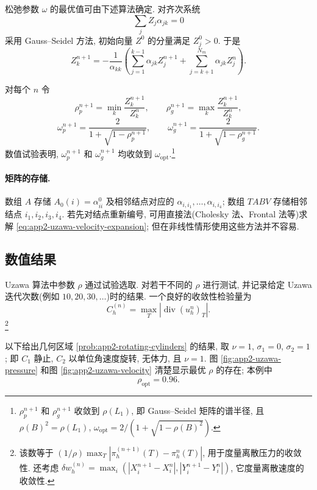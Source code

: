 松弛参数 $\omega$ 的最优值可由下述算法确定. 对齐次系统
\[
\sum_jZ_j\alpha_{jk}=0
\]
采用 Gauss--Seidel 方法, 初始向量 $Z^0$ 的分量满足 $Z_j^0>0$. 于是
\begin{equation}
Z_k^{n+1}=-\frac1{\alpha_{kk}}
\left(\sum_{j=1}^{k-1}\alpha_{jk}Z_j^{n+1}
+\sum_{j=k+1}^{N_m}\alpha_{jk}Z_j^n\right).
\label{eq:app2-gauss-seidel-iteration}
\end{equation}

\hypertarget{appendix-02-page-346}{}
对每个 $n$ 令
\begin{equation}
\rho_p^{n+1}=\min_k\frac{Z_k^{n+1}}{Z_k^n},
\qquad
\rho_g^{n+1}=\max_k\frac{Z_k^{n+1}}{Z_k^n},
\label{eq:app2-spectral-bounds}
\end{equation}
\begin{equation}
\omega_p^{n+1}=\frac2{1+\sqrt{1-\rho_p^{n+1}}},
\qquad
\omega_g^{n+1}=\frac2{1+\sqrt{1-\rho_g^{n+1}}}.
\label{eq:app2-optimal-relaxation-estimates}
\end{equation}
数值试验表明, $\omega_p^{n+1}$ 和 $\omega_g^{n+1}$ 均收敛到 $\omega_{\mathrm{opt}}$.\footnote{$\rho_p^{n+1}$ 和 $\rho_g^{n+1}$ 收敛到 $\rho(L_1)$, 即 Gauss--Seidel 矩阵的谱半径, 且 $\rho(B)^2=\rho(L_1)$, $\omega_{\mathrm{opt}}=2/(1+\sqrt{1-\rho(B)^2})$.}

\paragraph{矩阵的存储.}
数组 $A$ 存储 $A_0(i)=\alpha_{ii}^0$ 及相邻结点对应的 $\alpha_{i,i_1},\ldots,\alpha_{i,i_4}$; 数组 $TABV$ 存储相邻结点 $i_1,i_2,i_3,i_4$. 若先对结点重新编号, 可用直接法(Cholesky 法、Frontal 法等)求解 \eqref{eq:app2-uzawa-velocity-expansion}; 但在非线性情形使用这些方法并不容易.

\subsection{数值结果}
\label{subsec:app2-stokes-results}

Uzawa 算法中参数 $\rho$ 通过试验选取. 对若干不同的 $\rho$ 进行测试, 并记录给定 Uzawa 迭代次数(例如 $10,20,30,\ldots$)时的结果. 一个良好的收敛性检验量为
\[
C_h^{(n)}=\max_T|\operatorname{div}(u_h^n)_T|.
\]
\footnote{该数等于 $(1/\rho)\max_T|\pi_h^{(n+1)}(T)-\pi_h^n(T)|$, 用于度量离散压力的收敛性. 还考虑 $\delta w_h^{(n)}=\max_i(|X_i^{n+1}-X_i^n|,|Y_i^{n+1}-Y_i^n|)$, 它度量离散速度的收敛性.}

以下给出几何区域 \ref{prob:app2-rotating-cylinders} 的结果, 取 $\nu=1$, $\sigma_1=0$, $\sigma_2=1$; 即 $C_1$ 静止, $C_2$ 以单位角速度旋转, 无体力, 且 $\nu=1$. 图 \ref{fig:app2-uzawa-pressure} 和图 \ref{fig:app2-uzawa-velocity} 清楚显示最优 $\rho$ 的存在; 本例中
\[
\rho_{\mathrm{opt}}=0.96.
\]

